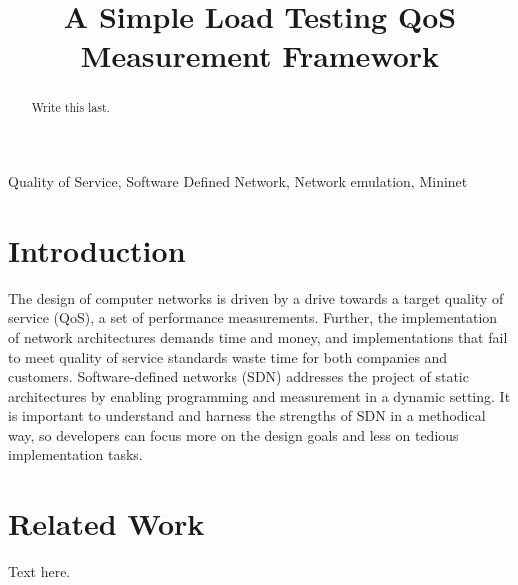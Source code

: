 \documentclass{article}
\title{A Simple Load Testing QoS Measurement Framework}
\begin{document}
%
\maketitle
%
\begin{abstract}
Write this last.
\end{abstract}
%
\begin{keywords}
Quality of Service, Software Defined Network, Network emulation, Mininet
\end{keywords}
%
\section{Introduction}
The design of computer networks is driven by a drive towards a target quality of service (QoS), a set of performance measurements. Further, the implementation of 
network architectures demands time and money, and implementations that fail to meet quality of service standards waste time for both companies and customers. 
Software-defined networks (SDN) addresses the project of static architectures by enabling programming and measurement in a dynamic setting. It is important to understand 
and harness the strengths of SDN in a methodical way, so developers can focus more on the design goals and less on tedious implementation tasks.

\section{Related Work}
Text here.

\end{document}
